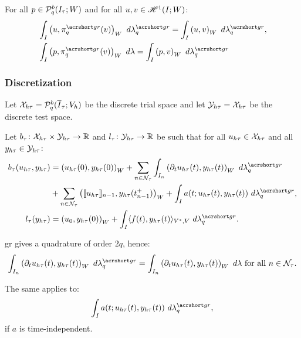 \begin{proposition}
    For all $p \in \mathcal{P}_{q}^b(I_{\tau}; W)$ and for all $u, v \in \mathscr{H}^{1}(I; W)$:
    \begin{align}
        & \int_I \left( u, \InterpolantGR_q(v) \right)_W ~ d \lambdaGR_q = \int_I \left( u, v \right)_W ~ d \lambdaGR_q, \\
        & \int_I \left( p, \InterpolantGR_q(v) \right)_W ~ d \lambda = \int_I \left( p, v \right)_W ~ d \lambdaGR_q
    \end{align}
\end{proposition}

\subsubsection{Discretization}

\begin{definition}
    Let $\mathcal{X}_{h \tau} = \mathcal{P}_{q}^b(\overline{I}_{\tau}; V_h)$ be the discrete trial space and let $\mathcal{Y}_{h \tau} = \mathcal{X}_{h \tau}$ be the discrete test space.
\end{definition}

\begin{definition}
    Let $b_{\tau} \colon \mathcal{X}_{h \tau} \times \mathcal{Y}_{h \tau} \rightarrow \mathbb{R}$ and $l_{\tau} \colon \mathcal{Y}_{h \tau} \rightarrow \mathbb{R}$ be such that for all $u_{h \tau} \in \mathcal{X}_{h \tau}$ and all $y_{h \tau} \in \mathcal{Y}_{h \tau}$:
    \begin{align}
        b_{\tau}(u_{h \tau}, y_{h \tau}) & = \left( u_{h \tau}(0), y_{h \tau}(0) \right)_W + \sum_{n \in \TimeIndices} \int_{I_n} \left( \partial_t u_{h \tau}(t), y_{h \tau}(t) \right)_W ~ d \lambdaGR_q \\
        & + \sum_{n \in \TimeIndices} \left( \llbracket u_{h \tau} \rrbracket_{n - 1}, y_{h \tau}(t_{n - 1}^+) \right)_W + \int_I a(t; u_{h \tau}(t), y_{h \tau}(t)) ~ d \lambdaGR_q, \notag \\
        l_{\tau}(y_{h \tau}) & = \left( u_0, y_{h \tau}(0) \right)_W + \int_I \langle f(t), y_{h \tau}(t) \rangle_{V^*, V} ~ d \lambdaGR_q.
    \end{align}
\end{definition}

\begin{remark}
    \acrshort{gr} gives a quadrature of order $2q$, hence:
    \begin{gather}
        \int_{I_n} \left( \partial_t u_{h \tau}(t), y_{h \tau}(t) \right)_W ~ d \lambdaGR_q = \int_{I_n} \left( \partial_t u_{h \tau}(t), y_{h \tau}(t) \right)_W ~ d \lambda \text{ for all } n \in \TimeIndices.
    \end{gather}
    
    The same applies to:
    \begin{gather}
        \int_I a(t; u_{h \tau}(t), y_{h \tau}(t)) ~ d \lambdaGR_q,
    \end{gather}
    if $a$ is time-independent.
\end{remark}

